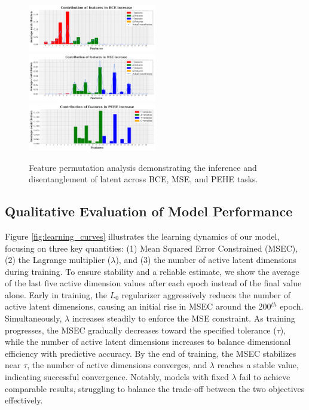 \documentclass[doubleblind]{ecai}
\begin{document}
	\begin{figure}
		\centering
		
		\includegraphics[width=0.5\textwidth]{Images/bce_increase_new_2.png}
		\includegraphics[width=0.5\textwidth]{Images/mse_increase_new_2.png}
		\includegraphics[width=0.5\textwidth]{Images/pehe_increase_new_2.png}
		
		
		\caption{Feature permutation analysis demonstrating the inference and disentanglement of latent across BCE, MSE, and PEHE tasks.}
		
		\label{fig:permutation}
		
	\end{figure}
	
	\subsection{Qualitative Evaluation of Model Performance}
	
	Figure \ref{fig:learning_curves} illustrates the learning dynamics of our model, focusing on three key quantities: (1) Mean Squared Error Constrained (MSEC), (2) the Lagrange multiplier ($\lambda$), and (3) the number of active latent dimensions during training. To ensure stability and a reliable estimate, we show the average of the last five active dimension values after each epoch instead of the final value alone. Early in training, the $L_0$ regularizer aggressively reduces the number of active latent dimensions, causing an initial rise in MSEC around the 200$^{th}$ epoch. Simultaneously, $\lambda$ increases steadily to enforce the MSE constraint. As training progresses, the MSEC gradually decreases toward the specified tolerance ($\tau$), while the number of active latent dimensions increases to balance dimensional efficiency with predictive accuracy. By the end of training, the MSEC stabilizes near $\tau$, the number of active dimensions converges, and $\lambda$ reaches a stable value, indicating successful convergence. Notably, models with fixed $\lambda$ fail to achieve comparable results, struggling to balance the trade-off between the two objectives effectively. 
	
\end{document}
